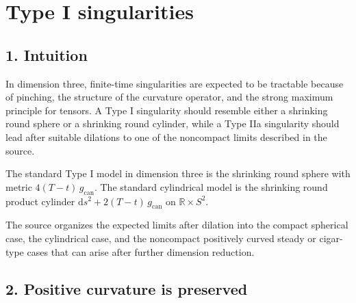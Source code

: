 \chapter{Type I singularities}

\section*{1. Intuition}

\begin{remark}
\label{ch09-rem-singularity-intuition}
In dimension three, finite-time singularities are expected to be tractable because of pinching, the structure of the curvature operator, and the strong maximum principle for tensors. A Type I singularity should resemble either a shrinking round sphere or a shrinking round cylinder, while a Type IIa singularity should lead after suitable dilations to one of the noncompact limits described in the source.
\end{remark}

\begin{remark}
\label{ch09-rem-canonical-model-geometries}
The standard Type I model in dimension three is the shrinking round sphere with metric \(4(T-t)\,g_{\mathrm{can}}\). The standard cylindrical model is the shrinking round product cylinder \(\mathrm{d}s^2+2(T-t)\,g_{\mathrm{can}}\) on \(\mathbb{R}\times S^2\).
\end{remark}

\begin{remark}
\label{ch09-rem-singularity-model-heuristics}
The source organizes the expected limits after dilation into the compact spherical case, the cylindrical case, and the noncompact positively curved steady or cigar-type cases that can arise after further dimension reduction.
\end{remark}

\section*{2. Positive curvature is preserved}

